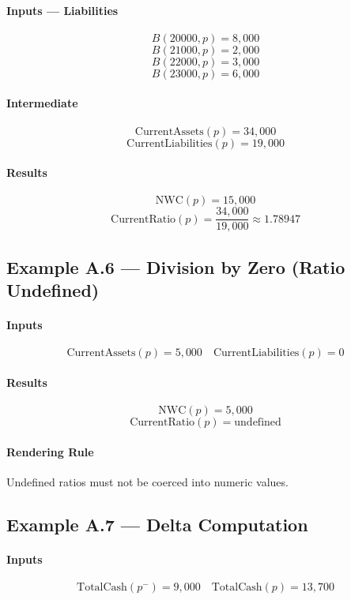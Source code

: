 \documentclass[11pt]{article}
\newcommand{\Balance}{B}
\newcommand{\Period}{p}
\newcommand{\Prior}{p^{-}}
\begin{document}
\paragraph{Inputs — Liabilities}
\[
\Balance(20000,\Period) = 8{,}000
\]
\[
\Balance(21000,\Period) = 2{,}000
\]
\[
\Balance(22000,\Period) = 3{,}000
\]
\[
\Balance(23000,\Period) = 6{,}000
\]

\paragraph{Intermediate}
\[
\text{CurrentAssets}(\Period) = 34{,}000
\]
\[
\text{CurrentLiabilities}(\Period) = 19{,}000
\]

\paragraph{Results}
\[
\text{NWC}(\Period) = 15{,}000
\]
\[
\text{CurrentRatio}(\Period) =
\frac{34{,}000}{19{,}000}
\approx 1.78947
\]

\subsection{Example A.6 — Division by Zero (Ratio Undefined)}

\paragraph{Inputs}
\[
\text{CurrentAssets}(\Period) = 5{,}000
\quad
\text{CurrentLiabilities}(\Period) = 0
\]

\paragraph{Results}
\[
\text{NWC}(\Period) = 5{,}000
\]
\[
\text{CurrentRatio}(\Period) = \text{undefined}
\]

\paragraph{Rendering Rule}
Undefined ratios must not be coerced into numeric values.

\subsection{Example A.7 — Delta Computation}

\paragraph{Inputs}
\[
\text{TotalCash}(\Prior) = 9{,}000
\quad
\text{TotalCash}(\Period) = 13{,}700
\]
\end{document}
